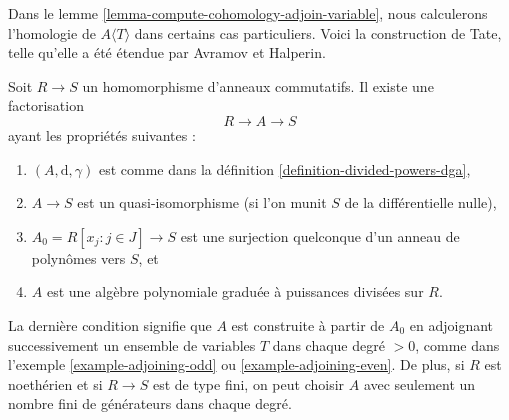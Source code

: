 \noindent
Dans le lemme \ref{lemma-compute-cohomology-adjoin-variable},
nous calculerons l'homologie de $A\langle T \rangle$ dans certains cas
particuliers. Voici la construction de Tate, telle qu'elle a été
étendue par Avramov et Halperin.

\begin{lemma}
\label{lemma-tate-resolution}
Soit $R \to S$ un homomorphisme d'anneaux commutatifs.
Il existe une factorisation
$$
R \to A \to S
$$
ayant les propriétés suivantes :
\begin{enumerate}
\item $(A, \text{d}, \gamma)$ est comme
dans la définition \ref{definition-divided-powers-dga},
\item $A \to S$ est un quasi-isomorphisme (si l'on munit $S$ de
la différentielle nulle),
\item $A_0 = R[x_j: j\in J] \to S$ est une surjection quelconque d'un anneau de
polynômes vers $S$, et
\item $A$ est une algèbre polynomiale graduée à puissances divisées sur $R$.
\end{enumerate}
La dernière condition signifie que $A$ est construite à partir de $A_0$ en
adjoignant successivement un ensemble de variables $T$ dans chaque degré $> 0$, comme
dans l'exemple \ref{example-adjoining-odd} ou \ref{example-adjoining-even}.
De plus, si $R$ est noethérien et si $R\to S$ est de type fini, on peut
choisir $A$ avec seulement un nombre fini de générateurs dans
chaque degré.
\end{lemma}

